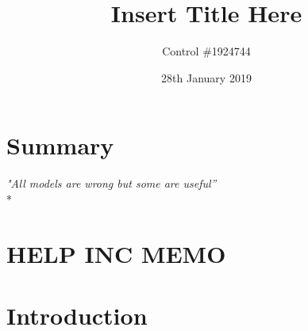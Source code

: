 \documentclass[a4paper,12pt]{article}
\begin{document}
\title{Insert Title Here}
\author{Control \#1924744}
\date{28th January 2019}
\maketitle
\newpage


\section*{\hfil Summary\hfil}
\begin{center}
\textit{"All models are wrong but some are useful''} \\*
\end{center}

\newpage

\section*{\hfil HELP INC MEMO\hfil}
\newpage


\tableofcontents
\newpage
{}


\newpage


\section{Introduction}
\end{document}
